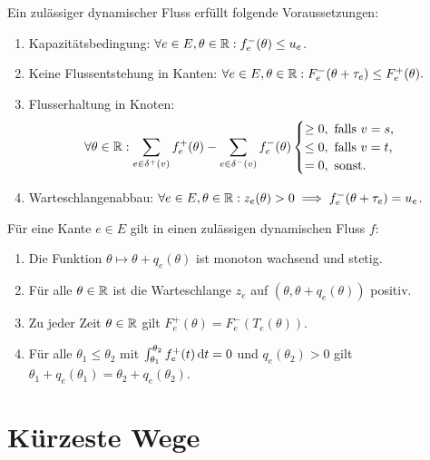 	\begin{definition}
		Ein zulässiger dynamischer Fluss erfüllt folgende Voraussetzungen:
		\begin{enumerate}[label=(F\arabic*)]
			\item\label{def-feasible-flow-capacity} Kapazitätsbedingung: $\forall e\in E, \theta\in\mathbb{R}: f_e^-(\theta)\leq u_e$.
			\item\label{def-feasible-flow-no-negative-flow} Keine Flussentstehung in Kanten: $\forall e\in E, \theta\in\mathbb{R}: F_e^-(\theta + \tau_e) \leq F_e^+(\theta).$
			\item\label{def-feasible-flow-no-flow-at-node} Flusserhaltung in Knoten:
			\[
			\forall\theta\in\mathbb{R}: \sum_{e\in\delta^+(v)}f^+_e(\theta) - \sum_{e\in\delta^-(v)} f_e^-(\theta) \begin{cases}
				\geq 0, \text{ falls $v=s$,}\\
				\leq 0, \text{ falls $v=t$,}\\
				= 0, \text{ sonst.}
			\end{cases}\]
			\item\label{def-feasible-flow-queue-with-capacity} Warteschlangenabbau:
			$\forall e\in E, \theta\in\mathbb{R}: z_e(\theta) > 0 \implies f_e^-(\theta + \tau_e) = u_e$.
		\end{enumerate}
	\end{definition}
	\begin{proposition}\label{prop-feasible-flow}
		Für eine Kante $e\in E$ gilt in einen zulässigen dynamischen Fluss $f$:
		\begin{enumerate}[label=(\roman*)]
			\item\label{prop-feasible-flow-T-mon-inc-cont} Die Funktion $\theta \mapsto \theta + q_e(\theta)$ ist monoton wachsend und stetig.
			\item\label{prop-feasible-flow-positive-queue} Für alle $\theta\in\mathbb{R}$ ist die Warteschlange $z_e$ auf $(\theta, \theta + q_e(\theta))$ positiv.
			\item\label{prop-feasible-flow-det-outflow} Zu jeder Zeit $\theta\in\mathbb{R}$ gilt $F_e^+(\theta) = F_e^-(T_e(\theta))$.
			\item\label{prop-feasible-flow-queue-delay} Für alle $\theta_1 \leq \theta_2$ mit $\int_{\theta_1}^{\theta_2} f^+_e(t) \mathop{}\!\mathrm{d} t = 0$ und $q_e(\theta_2)>0$ gilt $\theta_1 + q_e(\theta_1) = \theta_2 + q_e(\theta_2)$.
		\end{enumerate}
	\end{proposition}

\section{Kürzeste Wege}

